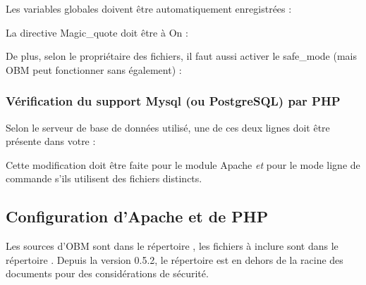 Les variables globales doivent être automatiquement enregistrées : 


La directive Magic\_quote doit être à On :


De plus, selon  le propriétaire des fichiers, il faut aussi activer le
safe\_mode (mais OBM peut fonctionner sans également) : 


\subsubsection{Vérification du support Mysql (ou PostgreSQL) par PHP}

Selon le serveur de base de données utilisé, une de ces deux lignes
doit être présente dans votre  : 


Cette modification doit être faite pour le module Apache
\emph{et} pour le mode ligne de commande s'ils utilisent des fichiers
 distincts.

\subsection{Configuration d'Apache et de PHP}

Les sources d'OBM sont dans le répertoire , les fichiers
à inclure sont dans le répertoire . Depuis la
version 0.5.2, le répertoire  est en dehors de la
racine des documents pour des considérations de sécurité.


